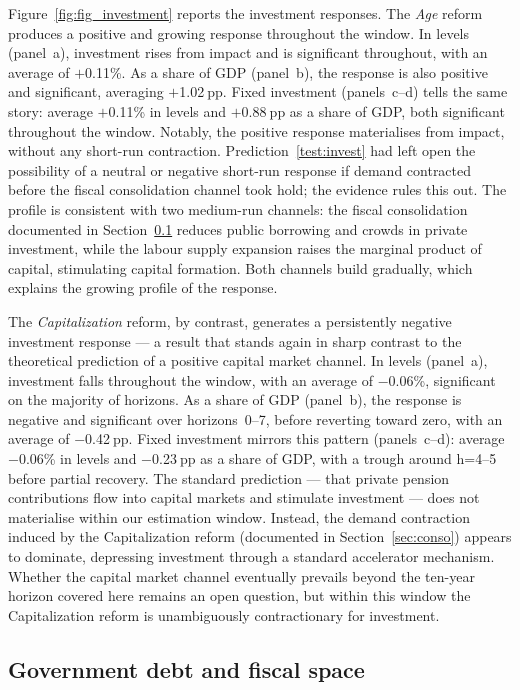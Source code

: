 \documentclass[11pt,english,a4paper, twoside, authoryear]{article}
\begin{document}
Figure~\ref{fig:fig_investment} reports the investment responses. The \textit{Age} reform produces a positive and growing response throughout the window. In levels (panel~a), investment rises from impact and is significant throughout, with an average of $+$0.11\%. As a share of GDP (panel~b), the response is also positive and significant, averaging $+$1.02$~$pp. Fixed investment (panels~c--d) tells the same story: average $+$0.11\% in levels and $+$0.88$~$pp as a share of GDP, both significant throughout the window. Notably, the positive response materialises from impact, without any short-run contraction. Prediction~\ref{test:invest} had left open the possibility of a neutral or negative short-run response if demand contracted before the fiscal consolidation channel took hold; the evidence rules this out. The profile is consistent with two medium-run channels: the fiscal consolidation documented in Section~\ref{sec:fiscal} reduces public borrowing and crowds in private investment, while the labour supply expansion raises the marginal product of capital, stimulating capital formation. Both channels build gradually, which explains the growing profile of the response.

The \textit{Capitalization} reform, by contrast, generates a persistently negative investment response --- a result that stands again in sharp contrast to the theoretical prediction of a positive capital market channel. In levels (panel~a), investment falls throughout the window, with an average of $-$0.06\%, significant on the majority of horizons. As a share of GDP (panel~b), the response is negative and significant over horizons~0--7, before reverting toward zero, with an average of $-$0.42$~$pp. Fixed investment mirrors this pattern (panels~c--d): average $-$0.06\% in levels and $-$0.23$~$pp as a share of GDP, with a trough around h=4--5 before partial recovery. The standard prediction --- that private pension contributions flow into capital markets and stimulate investment --- does not materialise within our estimation window. Instead, the demand contraction induced by the Capitalization reform (documented in Section~\ref{sec:conso}) appears to dominate, depressing investment through a standard accelerator mechanism. Whether the capital market channel eventually prevails beyond the ten-year horizon covered here remains an open question, but within this window the Capitalization reform is unambiguously contractionary for investment.

\FloatBarrier
\subsection{Government debt and fiscal space}\label{sec:fiscal}
\end{document}
